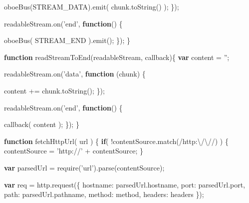 \documentclass[12pt, ]{article}
\newenvironment{Shaded}{}{}
\newcommand{\KeywordTok}[1]{\textcolor[rgb]{0.00,0.44,0.13}{\textbf{{#1}}}}
\newcommand{\DataTypeTok}[1]{\textcolor[rgb]{0.56,0.13,0.00}{{#1}}}
\newcommand{\FloatTok}[1]{\textcolor[rgb]{0.25,0.63,0.44}{{#1}}}
\newcommand{\StringTok}[1]{\textcolor[rgb]{0.25,0.44,0.63}{{#1}}}
\newcommand{\OtherTok}[1]{\textcolor[rgb]{0.00,0.44,0.13}{{#1}}}
\newcommand{\FunctionTok}[1]{\textcolor[rgb]{0.02,0.16,0.49}{{#1}}}
\newcommand{\NormalTok}[1]{{#1}}
\begin{document}
\begin{Shaded}
\begin{Highlighting}[]
         \FunctionTok{oboeBus}\NormalTok{(STREAM_DATA).}\FunctionTok{emit}\NormalTok{( }\OtherTok{chunk}\NormalTok{.}\FunctionTok{toString}\NormalTok{() );}
      \NormalTok{\});}
      
      \OtherTok{readableStream}\NormalTok{.}\FunctionTok{on}\NormalTok{(}\StringTok{'end'}\NormalTok{, }\KeywordTok{function}\NormalTok{() \{}
               
         \FunctionTok{oboeBus}\NormalTok{( STREAM_END ).}\FunctionTok{emit}\NormalTok{();}
      \NormalTok{\});}
   \NormalTok{\}}
   
   \KeywordTok{function} \FunctionTok{readStreamToEnd}\NormalTok{(readableStream, callback)\{}
      \KeywordTok{var} \NormalTok{content = }\StringTok{''}\NormalTok{;}
   
      \OtherTok{readableStream}\NormalTok{.}\FunctionTok{on}\NormalTok{(}\StringTok{'data'}\NormalTok{, }\KeywordTok{function} \NormalTok{(chunk) \{}
                                             
         \NormalTok{content += }\OtherTok{chunk}\NormalTok{.}\FunctionTok{toString}\NormalTok{();}
      \NormalTok{\});}
      
      \OtherTok{readableStream}\NormalTok{.}\FunctionTok{on}\NormalTok{(}\StringTok{'end'}\NormalTok{, }\KeywordTok{function}\NormalTok{() \{}
               
         \FunctionTok{callback}\NormalTok{( content );}
      \NormalTok{\});}
   \NormalTok{\}}
   
   \KeywordTok{function} \FunctionTok{fetchHttpUrl}\NormalTok{( url ) \{}
      \KeywordTok{if}\NormalTok{( !}\OtherTok{contentSource}\NormalTok{.}\FunctionTok{match}\NormalTok{(}\OtherTok{/http:}\FloatTok{\textbackslash{}/\textbackslash{}/}\OtherTok{/}\NormalTok{) ) \{}
         \NormalTok{contentSource = }\StringTok{'http://'} \NormalTok{+ contentSource;}
      \NormalTok{\}                           }
                           
      \KeywordTok{var} \NormalTok{parsedUrl = }\FunctionTok{require}\NormalTok{(}\StringTok{'url'}\NormalTok{).}\FunctionTok{parse}\NormalTok{(contentSource); }
   
      \KeywordTok{var} \NormalTok{req = }\OtherTok{http}\NormalTok{.}\FunctionTok{request}\NormalTok{(\{}
         \DataTypeTok{hostname}\NormalTok{: }\OtherTok{parsedUrl}\NormalTok{.}\FunctionTok{hostname}\NormalTok{,}
         \DataTypeTok{port}\NormalTok{: }\OtherTok{parsedUrl}\NormalTok{.}\FunctionTok{port}\NormalTok{, }
         \DataTypeTok{path}\NormalTok{: }\OtherTok{parsedUrl}\NormalTok{.}\FunctionTok{pathname}\NormalTok{,}
         \DataTypeTok{method}\NormalTok{: method,}
         \DataTypeTok{headers}\NormalTok{: headers }
      \NormalTok{\});}
      

\end{Highlighting}
\end{Shaded}
\end{document}
